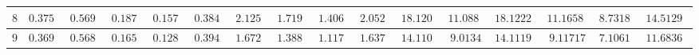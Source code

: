 \begin{landscape}
\begin{tabular}{|c|c|c|c|c|c|c|c|c|c|c|c|c|c|c|c}
$8$          & $0.3753$                                                        & $0.5692$                                                        & $0.1879$                                                          & $0.1572$                                                           & $0.3848$                                                              & $2.1253$                                                        & $1.7198$                                                          & $1.4066$                                                           & $2.0527$                                                              & $18.1200$                                                       & $11.0885$                                                         & $18.12225$                                                       & $11.16584$                                                         & $8.73184$                                                           & \multicolumn{1}{c|}{$14.51292$}                                                             \\ \hline
$9$          & $0.3691$                                                        & $0.5683$                                                        & $0.1657$                                                          & $0.1287$                                                           & $0.3947$                                                              & $1.6726$                                                        & $1.3882$                                                          & $1.1171$                                                           & $1.6378$                                                              & $14.1104$                                                       & $9.0134$                                                          & $14.11191$                                                       & $9.11717$                                                          & $7.10618$                                                           & \multicolumn{1}{c|}{$11.68362$}                                                             \\ \hline

\end{tabular}
\end{landscape}
